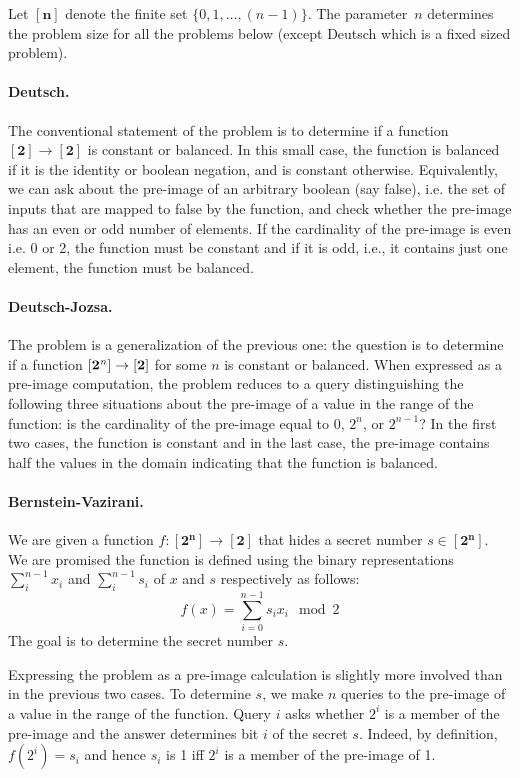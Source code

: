 \documentclass[sigplan,review]{acmart}
\newcommand{\finset}[1]{[\mathbf{#1}]}
\theoremstyle{definition}
\begin{document}
\noindent Let $\finset{n}$ denote the finite set $\{ 0,1,\ldots,(n-1)\}$. The
parameter~$n$ determines the problem size for all the problems below
(except Deutsch which is a fixed sized problem).

\paragraph*{Deutsch.}
The conventional statement of the problem is to determine if a
function $\finset{2} \rightarrow \finset{2}$ is constant or
balanced. In this small case, the function is balanced if it is the
identity or boolean negation, and is constant otherwise. Equivalently,
we can ask about the pre-image of an arbitrary boolean (say false),
i.e. the set of inputs that are mapped to false by the function, and
check whether the pre-image has an even or odd number of elements. If
the cardinality of the pre-image is even i.e. 0 or 2, the function
must be constant and if it is odd, i.e., it contains just one element,
the function must be balanced.

\paragraph*{Deutsch-Jozsa.}
The problem is a generalization of the previous one: the question is
to determine if a function $\finset{2^{\it n}} \rightarrow \finset{2}$ for
some $n$ is constant or balanced. When expressed as a pre-image
computation, the problem reduces to a query distinguishing the
following three situations about the pre-image of a value in the range
of the function: is the cardinality of the pre-image equal to 0,
$2^n$, or $2^{n-1}$? In the first two cases, the function is constant
and in the last case, the pre-image contains half the values in the
domain indicating that the function is balanced.

\paragraph*{Bernstein-Vazirani.}
We are given a function $f : \finset{2^n} \rightarrow \finset{2}$
that hides a secret number $s \in \finset{2^n}$. We are promised the
function is defined using the binary representations $\sum_i^{n-1}
x_i$ and $\sum_i^{n-1} s_i$ of $x$ and $s$ respectively as follows:
\[
f(x) = \sum_{i=0}^{n-1} s_ix_i \mod{2}
\]
The goal is to determine the secret number $s$. 

Expressing the problem as a pre-image calculation is slightly more
involved than in the previous two cases. To determine $s$, we make $n$
queries to the pre-image of a value in the range of the
function. Query $i$ asks whether $2^i$ is a member of the pre-image
and the answer determines bit $i$ of the secret $s$. Indeed, by
definition, $f(2^i) = s_i$ and hence $s_i$ is 1 iff $2^i$ is a member
of the pre-image of 1.
\end{document}
